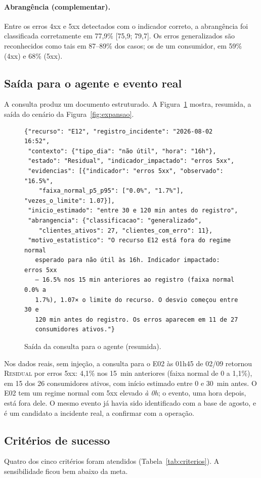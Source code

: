 \documentclass[sigconf,nonacm]{acmart}
\newcommand{\Residual}{\textsc{Residual}\xspace}
\begin{document}
\paragraph{Abrangência (complementar).} Entre os erros 4xx e 5xx detectados com o indicador correto, a abrangência foi classificada corretamente em 77,9\% [75,9; 79,7]. Os erros generalizados são reconhecidos como tais em 87--89\% dos casos; os de um consumidor, em 59\% (4xx) e 68\% (5xx).

\subsection{Saída para o agente e evento real}
A consulta produz um documento estruturado. A Figura~\ref{fig:json} mostra, resumida, a saída do cenário da Figura~\ref{fig:expansao}.

\begin{figure}[t]
\begin{Verbatim}[fontsize=\scriptsize,frame=single]
{"recurso": "E12", "registro_incidente": "2026-08-02 16:52",
 "contexto": {"tipo_dia": "não útil", "hora": "16h"},
 "estado": "Residual", "indicador_impactado": "erros 5xx",
 "evidencias": [{"indicador": "erros 5xx", "observado": "16.5%",
    "faixa_normal_p5_p95": ["0.0%", "1.7%"], "vezes_o_limite": 1.07}],
 "inicio_estimado": "entre 30 e 120 min antes do registro",
 "abrangencia": {"classificacao": "generalizado",
    "clientes_ativos": 27, "clientes_com_erro": 11},
 "motivo_estatistico": "O recurso E12 está fora do regime normal
   esperado para não útil às 16h. Indicador impactado: erros 5xx
   — 16.5% nos 15 min anteriores ao registro (faixa normal 0.0% a
   1.7%), 1.07× o limite do recurso. O desvio começou entre 30 e
   120 min antes do registro. Os erros aparecem em 11 de 27
   consumidores ativos."}
\end{Verbatim}
\caption{Saída da consulta para o agente (resumida).}
\label{fig:json}
\end{figure}

Nos dados reais, sem injeção, a consulta para o E02 às 01h45 de 02/09 retornou \Residual por erros 5xx: 4,1\% nos 15~min anteriores (faixa normal de 0 a 1,1\%), em 15 dos 26 consumidores ativos, com início estimado entre 0 e 30~min antes. O E02 tem um regime normal com 5xx elevado \emph{à 0h}; o evento, uma hora depois, está fora dele. O mesmo evento já havia sido identificado com a base de agosto, e é um candidato a incidente real, a confirmar com a operação.

\subsection{Critérios de sucesso}
Quatro dos cinco critérios foram atendidos (Tabela~\ref{tab:criterios}). A sensibilidade ficou bem abaixo da meta.
\end{document}
